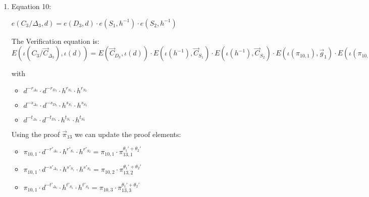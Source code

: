 \begin{description}
\begin{enumerate}
\begin{enumerate}
      \begin{itemize}
      \item[$\pi'_{9,1} = $] $\pi_{9,1} \cdot d^{-r'_{\Delta_2}} \cdot f^{-r'_{S_2}} = \pi_{9,1} \cdot \pi_{15,1}^{-\theta_2'}$
      \item[$\pi'_{9,2} = $] $\pi_{9,2} \cdot d^{-s'_{\Delta_2}} \cdot f^{-s'_{S_2}} = \pi_{9,2} \cdot \pi_{15,2}^{-\theta_2'}$
      \item[$\pi'_{9,3} = $] $\pi_{9,3} \cdot d^{-t'_{\Delta_2}} \cdot f^{-t'_{S_2}} = \pi_{9,3} \cdot \pi_{15,3}^{-\theta_2'}$
      \end{itemize}

    \item Equation 10:

      $e(C_3/\boxed{\Delta_3}, d) = e (\boxed{D_3},d) \cdot e(\boxed{S_1}, h^{-1})\cdot e(\boxed{S_2}, h^{-1})$

      The Verification equation is: $ E(\iota(C_3/\vec{C}_{\Delta_3}), \iota(d)) = E(\vec{C}_{D_3},\iota(d)) \cdot E(\iota(h^{-1}), \vec{C}_{S_1}) \cdot E(\iota(h^{-1}), \vec{C}_{S_2}) \cdot E(\iota(\pi_{10,1}), \vec{g}_1)\cdot E(\iota(\pi_{10,2}), \vec{g}_2)\cdot E(\iota(\pi_{10,3}), \vec{g}_3)$

      with
      \begin{itemize}
      \item[$\pi_{10,1} = $] $d^{-r_{\Delta_3}} \cdot d^{-r_{D_3}} \cdot h^{r_{S_1}} \cdot h^{r_{S_2}}$
      \item[$\pi_{10,2} = $] $d^{-s_{\Delta_3}} \cdot d^{-s_{D_3}} \cdot h^{s_{S_1}} \cdot h^{s_{S_2}}$
      \item[$\pi_{10,3} = $] $d^{-t_{\Delta_3}} \cdot d^{-t_{D_3}} \cdot h^{t_{S_1}} \cdot h^{t_{S_2}}$
      \end{itemize}

      Using the proof $\vec{\pi}_{13}$ we can update the proof elements:

      \begin{itemize}
      \item[$\pi'_{10,1} = $] $\pi_{10,1} \cdot d^{-r'_{\Delta_3}} \cdot h^{r'_{S_1}} \cdot h^{r'_{S_2}} = \pi_{10,1} \cdot \pi_{13,1}^{\theta_1'+\theta_2'}$
      \item[$\pi'_{10,2} = $] $\pi_{10,1} \cdot d^{-s'_{\Delta_3}} \cdot h^{s'_{S_1}} \cdot h^{s'_{S_2}} = \pi_{10,2} \cdot \pi_{13,2}^{\theta_1'+\theta_2'}$
      \item[$\pi'_{10,3} = $] $\pi_{10,1} \cdot d^{-t'_{\Delta_3}} \cdot h^{t'_{S_1}} \cdot h^{t'_{S_2}} = \pi_{10,3} \cdot \pi_{13,3}^{\theta_1'+\theta_2'}$
      \end{itemize}
      

\end{enumerate}
\end{enumerate}
\end{description}
